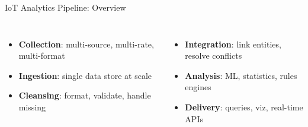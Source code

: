 \documentclass[aspectratio=169,11pt]{beamer}
\begin{document}
\begin{frame}{IoT Analytics Pipeline: Overview}
    \vspace{0.05cm}
    \begin{columns}
        \begin{itemize}\setlength{\itemsep}{0pt}
            \item \textbf{Collection}: multi-source, multi-rate, multi-format
            \item \textbf{Ingestion}: single data store at scale
            \item \textbf{Cleansing}: format, validate, handle missing
        \end{itemize}
        \begin{itemize}\setlength{\itemsep}{0pt}
            \item \textbf{Integration}: link entities, resolve conflicts
            \item \textbf{Analysis}: ML, statistics, rules engines
            \item \textbf{Delivery}: queries, viz, real-time APIs
        \end{itemize}
    \end{columns}
\end{frame}
\end{document}
